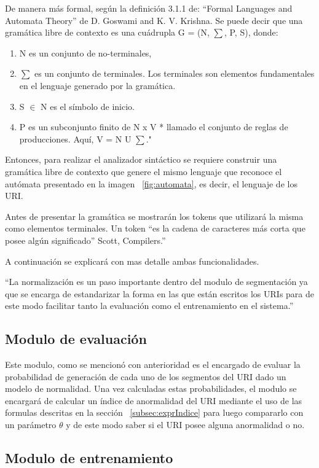 De manera más formal, según la definición 3.1.1 de: “Formal Languages and Automata Theory” de D. Goswami and K. V. Krishna. Se puede decir que una gramática libre de contexto es una  cuádrupla G = (N, $\sum$, P, S), donde:
\begin{enumerate}
\item N es un conjunto de no-terminales,
\item $\sum$ es un conjunto de terminales. Los terminales son elementos fundamentales en el lenguaje generado por la gramática.
\item S $\in$ N es el símbolo de inicio.
\item P es un subconjunto finito de N x V * llamado el conjunto de reglas de producciones. Aquí, V = N U $\sum$."
\end{enumerate}

Entonces, para realizar el analizador sintáctico se requiere construir una gramática libre de contexto que genere el mismo lenguaje que reconoce el autómata presentado en la imagen ~\ref{fig:automata}, es decir, el lenguaje de los URI.

Antes de presentar la gramática se mostrarán los tokens que utilizará la misma como elementos terminales. Un token “es la cadena de caracteres más corta que posee algún significado” Scott, Compilers.''




A continuación se explicará con mas detalle ambas funcionalidades. 

``La normalización es un paso importante dentro del modulo de segmentación ya que se encarga de estandarizar la forma en las que están escritos los URIs para de este modo facilitar tanto la evaluación como el entrenamiento en el sistema.''

\subsection{Modulo de evaluación}
\label{sec:evaluacion}

Este modulo, como se mencionó con anterioridad es el encargado de evaluar la probabilidad de generación de cada uno de los segmentos del URI dado un modelo de normalidad. Una vez calculadas estas probabilidades, el modulo se encargará de calcular un índice de anormalidad del URI mediante el uso de las formulas descritas en la sección ~\ref{subsec:exprIndice} para luego compararlo con un parámetro $\theta$ y de este modo saber si el URI posee alguna anormalidad o no. 


\subsection{Modulo de entrenamiento}\label{sec:entrenamiento}

